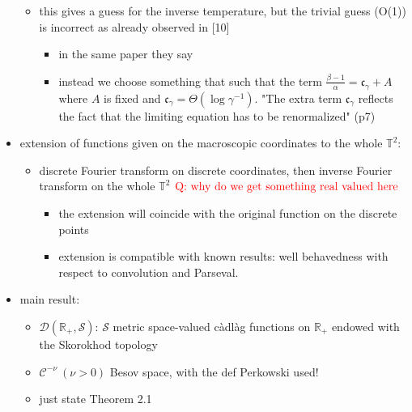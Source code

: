 \documentclass{report}
\theoremstyle{remark}
\theoremstyle{definition}
\begin{document}
\begin{itemize}
\begin{itemize}
    \item this gives a guess for the inverse temperature, but the trivial guess (O(1)) is incorrect as already observed in [10]
    \begin{itemize}
      \item in the same paper they say 
      \item instead we choose something that such that the term $\frac{\beta -1}{\alpha} = \mathfrak{c}_\gamma +A$ where $A$ is fixed and $\mathfrak{c}_\gamma = \Theta(\log{\gamma^{-1}})$. "The extra term $\mathfrak{c}_\gamma$ reflects the fact that the limiting equation has to be renormalized" (p7)
    \end{itemize}
  \end{itemize}
  \item extension of functions given on the macroscopic coordinates to the whole $\mathbb{T}^2$:
  \begin{itemize}
    \item discrete Fourier transform on discrete coordinates, then inverse Fourier transform on the whole $\mathbb{T}^2$ $\textcolor{red}{\text{Q: why do we get something real valued here}}$   
    \begin{itemize}
      \item the extension will coincide with the original function on the discrete points
      \item extension is compatible with known results: well behavedness with respect to convolution and Parseval.
    \end{itemize}
  \end{itemize}
  \item main result:
  \begin{itemize}
    \item $\mathcal{D}(\mathbb{R}_+, \mathcal{S})$: $\mathcal{S}$ metric space-valued càdlàg functions on $\mathbb{R}_+$ endowed with the Skorokhod topology
    \item $\mathcal{C}^{-\nu}~(\nu > 0)$ Besov space, with the def Perkowski used!
    \item just state Theorem 2.1
  \end{itemize}
\end{itemize}
\end{document}
